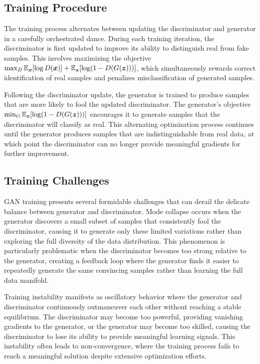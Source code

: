 \subsection{Training Procedure}

The training process alternates between updating the discriminator and generator in a carefully orchestrated dance. During each training iteration, the discriminator is first updated to improve its ability to distinguish real from fake samples. This involves maximizing the objective $\max_D \mathbb{E}_{\boldsymbol{x}}[\log D(\boldsymbol{x})] + \mathbb{E}_{\boldsymbol{z}}[\log(1 - D(G(\boldsymbol{z})))]$, which simultaneously rewards correct identification of real samples and penalizes misclassification of generated samples.

Following the discriminator update, the generator is trained to produce samples that are more likely to fool the updated discriminator. The generator's objective $\min_G \mathbb{E}_{\boldsymbol{z}}[\log(1 - D(G(\boldsymbol{z})))]$ encourages it to generate samples that the discriminator will classify as real. This alternating optimization process continues until the generator produces samples that are indistinguishable from real data, at which point the discriminator can no longer provide meaningful gradients for further improvement.

\subsection{Training Challenges}

GAN training presents several formidable challenges that can derail the delicate balance between generator and discriminator. Mode collapse occurs when the generator discovers a small subset of samples that consistently fool the discriminator, causing it to generate only these limited variations rather than exploring the full diversity of the data distribution. This phenomenon is particularly problematic when the discriminator becomes too strong relative to the generator, creating a feedback loop where the generator finds it easier to repeatedly generate the same convincing samples rather than learning the full data manifold.

Training instability manifests as oscillatory behavior where the generator and discriminator continuously outmaneuver each other without reaching a stable equilibrium. The discriminator may become too powerful, providing vanishing gradients to the generator, or the generator may become too skilled, causing the discriminator to lose its ability to provide meaningful learning signals. This instability often leads to non-convergence, where the training process fails to reach a meaningful solution despite extensive optimization efforts.

